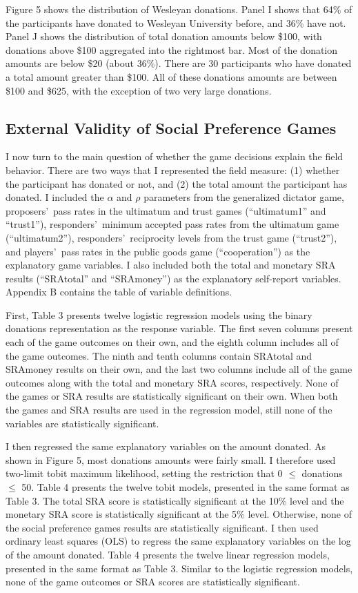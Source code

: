 \documentclass[12pt]{article}
\begin{document}
Figure 5 shows the distribution of Wesleyan donations. Panel I shows that 64\% of the participants have donated to Wesleyan University before, and 36\% have not. Panel J shows the distribution of total donation amounts below \$100, with donations above \$100 aggregated into the rightmost bar. Most of the donation amounts are below \$20 (about 36\%). There are 30 participants who have donated a total amount greater than \$100. All of these donations amounts are between \$100 and \$625, with the exception of two very large donations.

\subsection{External Validity of Social Preference Games}
I now turn to the main question of whether the game decisions explain the field behavior. There are two ways that I represented the field measure: (1) whether the participant has donated or not, and (2) the total amount the participant has donated. I included the \(\alpha\) and \(\rho\) parameters from the generalized dictator game, proposers\rq \ pass rates in the ultimatum and trust games (``ultimatum1'' and ``trust1''), responders\rq \ minimum accepted pass rates from the ultimatum game (``ultimatum2''), responders\rq \ reciprocity levels from the trust game (``trust2''), and players\rq \ pass rates in the public goods game (``cooperation'') as the explanatory game variables. I also included both the total and monetary SRA results (``SRAtotal'' and ``SRAmoney'') as the explanatory self-report variables. Appendix B contains the table of variable definitions. 

First, Table 3 presents twelve logistic regression models using the binary donations representation as the response variable. The first seven columns present each of the game outcomes on their own, and the eighth column includes all of the game outcomes. The ninth and tenth columns contain SRAtotal and SRAmoney results on their own, and the last two columns include all of the game outcomes along with the total and monetary SRA scores, respectively. None of the games or SRA results are statistically significant on their own. When both the games and SRA results are used in the regression model, still none of the variables are statistically significant. 

I then regressed the same explanatory variables on the amount donated. As shown in Figure 5, most donations amounts were fairly small. I therefore used two-limit tobit maximum likelihood, setting the restriction that 0 $\leq$ donations $\leq$ 50.  Table 4 presents the twelve tobit models, presented in the same format as Table 3. The total SRA score is statistically significant at the 10\% level and the monetary SRA score is statistically significant at the 5\% level. Otherwise, none of the social preference games results are statistically significant.
{\color{blue} I then used ordinary least squares (OLS) to regress the same explanatory variables on the log of the amount donated. Table 4 presents the twelve linear regression models, presented in the same format as Table 3. Similar to the logistic regression models, none of the game outcomes or SRA scores are statistically significant.}
\end{document}

